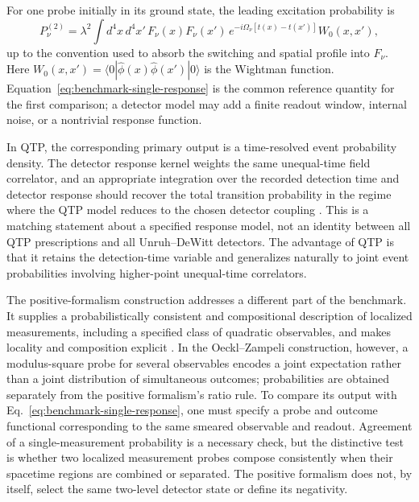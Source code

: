 \documentclass[pdflatex,sn-mathphys-num]{sn-jnl}
\begin{document}
For one probe initially in its ground state, the leading excitation probability is
\begin{equation}
P_\nu^{(2)}
=\lambda^2\int d^4x\,d^4x'\,
F_\nu(x)F_\nu(x')\,e^{-i\Omega_\nu[t(x)-t(x')]}
W_0(x,x'),
\label{eq:benchmark-single-response}
\end{equation}
up to the convention used to absorb the switching and spatial profile into $F_\nu$. Here
$W_0(x,x')=\langle0|\hat\phi(x)\hat\phi(x')|0\rangle$
is the Wightman function. Equation~\eqref{eq:benchmark-single-response} is the common reference quantity for the first comparison; a detector model may add a finite readout window, internal noise, or a nontrivial response function.

In QTP, the corresponding primary output is a time-resolved event probability density. The detector response kernel weights the same unequal-time field correlator, and an appropriate integration over the recorded detection time and detector response should recover the total transition probability in the regime where the QTP model reduces to the chosen detector coupling \cite{AnastopoulosHuSavvidou2023,Koliopoulou2026}. This is a matching statement about a specified response model, not an identity between all QTP prescriptions and all Unruh--DeWitt detectors. The advantage of QTP is that it retains the detection-time variable and generalizes naturally to joint event probabilities involving higher-point unequal-time correlators.

The positive-formalism construction addresses a different part of the benchmark. It supplies a probabilistically consistent and compositional description of localized measurements, including a specified class of quadratic observables, and makes locality and composition explicit \cite{Oeckl2026,OecklZampeli2026}. In the Oeckl--Zampeli construction, however, a modulus-square probe for several observables encodes a joint expectation rather than a joint distribution of simultaneous outcomes; probabilities are obtained separately from the positive formalism's ratio rule. To compare its output with Eq.~\eqref{eq:benchmark-single-response}, one must specify a probe and outcome functional corresponding to the same smeared observable and readout. Agreement of a single-measurement probability is a necessary check, but the distinctive test is whether two localized measurement probes compose consistently when their spacetime regions are combined or separated. The positive formalism does not, by itself, select the same two-level detector state or define its negativity.
\end{document}
